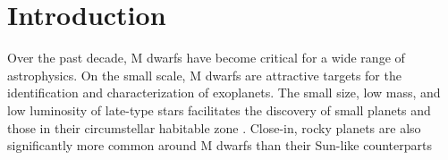 \documentclass[twocolumn]{aastex62}
\begin{document}



\section{Introduction}\label{sec:intro}
Over the past decade, M dwarfs have become critical for a wide range of astrophysics. On the small scale, M dwarfs are attractive targets for the identification and characterization of exoplanets. The small size, low mass, and low luminosity of late-type stars facilitates the discovery of small planets \citep[e.g.][]{Muirhead2012,Martinez:2017aa,Mann:2018} and those in their circumstellar habitable zone \citep[e.g.,][]{Tarter2007,Shields:2016aa,Dittmann2017b}. Close-in, rocky planets are also significantly more common around M dwarfs than their Sun-like counterparts \citep{Dressing2013,2013PNAS..11019273P,Mulders2015,Gaidos2016b}
\end{document}
